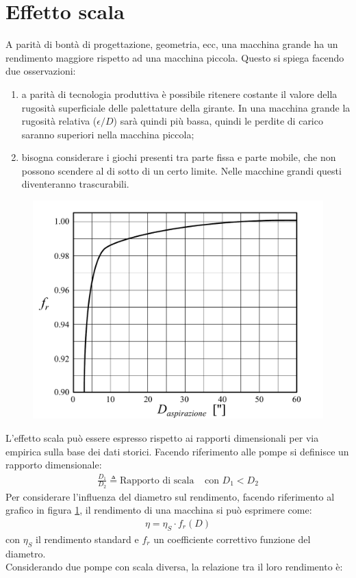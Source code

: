 \section{Effetto scala}
A parità di bontà di progettazione, geometria, ecc, una macchina grande ha un rendimento maggiore rispetto ad una macchina piccola. Questo si spiega facendo due osservazioni: 
\begin{enumerate}
	\item a parità di tecnologia produttiva è possibile ritenere costante il valore della rugosità superficiale delle palettature della girante. In una macchina grande la rugosità relativa ($\epsilon/D$) sarà quindi più bassa, quindi le perdite di carico saranno superiori nella macchina piccola;
	\item bisogna considerare i giochi presenti tra parte fissa e parte mobile, che non possono scendere al di sotto di un certo limite. Nelle macchine grandi questi diventeranno trascurabili. 
\end{enumerate}
\begin{figure}
\centering
  \includegraphics[width=.5\textwidth]{fig/dDchart.pdf}
\caption{}
\label{fig:dDchart}
\end{figure}
L'effetto scala può essere espresso rispetto ai rapporti dimensionali per via empirica sulla base dei dati storici. Facendo riferimento alle pompe si definisce un rapporto dimensionale:
\begin{align*}
\frac{D_1}{D_2} \triangleq  \mbox{Rapporto di scala} \;\;\;\; \text{con } D_1 < D_2
\end{align*}
Per considerare l'influenza del diametro sul rendimento, facendo riferimento al grafico in figura \ref{fig:dDchart}, il rendimento di una macchina si può esprimere come:
\begin{align*}
\eta = \eta_S \cdot f_r(D)
\end{align*}
con $\eta_S$ il rendimento standard e $f_r$ un coefficiente correttivo funzione del diametro.\\
Considerando due pompe con scala diversa, la relazione tra il loro rendimento è:
